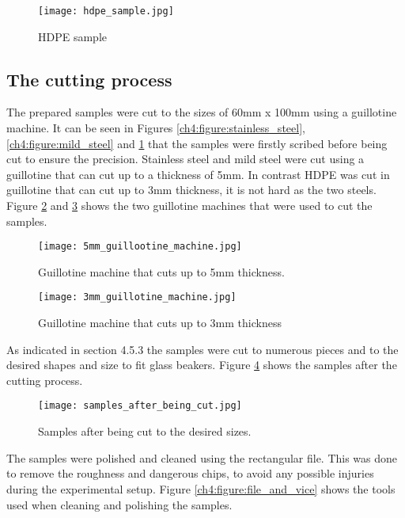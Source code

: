 \begin{figure}[H]
    \centering
    \texttt{[image: hdpe\_sample.jpg]}
    \caption{HDPE sample}
    \label{ch4:figure:hdpe}
\end{figure}

\subsection{The cutting process}
The prepared samples were cut to the sizes of 60mm x 100mm using a guillotine machine. It can be seen in Figures \ref{ch4:figure:stainless_steel}, \ref{ch4:figure:mild_steel} and \ref{ch4:figure:hdpe} that the samples were firstly scribed before being cut to ensure the precision. Stainless steel and mild steel were cut using a guillotine that can cut up to a thickness of 5mm. In contrast HDPE was cut in guillotine that can cut up to 3mm thickness, it is not hard as the two steels. Figure \ref{ch4:figure:5mm_guillotine} and \ref{ch4:figure:3mm_guillotine} shows the two guillotine machines that were used to cut the samples.
 
\begin{figure}[H]
    \centering
    \texttt{[image: 5mm\_guillootine\_machine.jpg]}
    \caption{Guillotine machine that cuts up to 5mm thickness.}
    \label{ch4:figure:5mm_guillotine}
\end{figure}
 
\begin{figure}[H]
    \centering
    \texttt{[image: 3mm\_guillotine\_machine.jpg]}
    \caption{Guillotine machine that cuts up to 3mm thickness}
    \label{ch4:figure:3mm_guillotine}
\end{figure}

As indicated in section 4.5.3 the samples were cut to numerous pieces and to the desired shapes and size to fit glass beakers. Figure \ref{ch4:figure:samples} shows the samples after the cutting process. 
 
\begin{figure}[H]
    \centering
    \texttt{[image: samples\_after\_being\_cut.jpg]}
    \caption{Samples after being cut to the desired sizes.}
    \label{ch4:figure:samples}
\end{figure}

The samples were polished and cleaned using the rectangular file. This was done to remove the roughness and dangerous chips, to avoid any possible injuries during the experimental setup. Figure \ref{ch4:figure:file_and_vice} shows the tools used when cleaning and polishing the samples.
 

